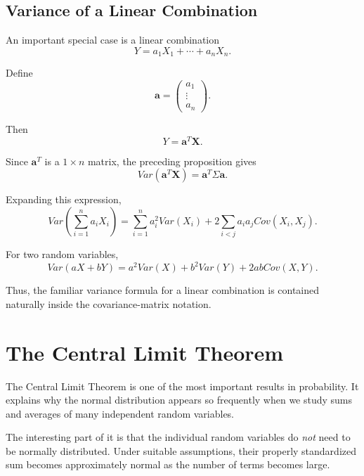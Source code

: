 \documentclass[11pt]{article}
\theoremstyle{definition}
\theoremstyle{plain}
\theoremstyle{remark}
\begin{document}
\subsection*{Variance of a Linear Combination}

An important special case is a linear combination
\[
Y=a_1X_1+\cdots+a_nX_n.
\]

Define
\[
\mathbf{a}
=
\begin{pmatrix}
a_1\\
\vdots\\
a_n
\end{pmatrix}.
\]

Then
\[
Y=\mathbf{a}^T\mathbf{X}.
\]

Since $\mathbf{a}^T$ is a $1\times n$ matrix, the preceding
proposition gives
\[
{
Var(\mathbf{a}^T\mathbf{X})
=
\mathbf{a}^T\Sigma\mathbf{a}.
}
\]

Expanding this expression,
\[
{
Var\left(\sum_{i=1}^n a_iX_i\right)
=
\sum_{i=1}^n a_i^2Var(X_i)
+
2\sum_{i<j}a_ia_jCov(X_i,X_j).
}
\]

For two random variables,
\[
{
Var(aX+bY)
=
a^2Var(X)
+
b^2Var(Y)
+
2abCov(X,Y).
}
\]

Thus, the familiar variance formula for a linear combination is
contained naturally inside the covariance-matrix notation.










\section{The Central Limit Theorem}

The Central Limit Theorem is one of the most important results in
probability. It explains why the normal distribution appears so
frequently when we study sums and averages of many independent random
variables.

The interesting part of it is that the individual random variables do
\emph{not} need to be normally distributed. Under suitable assumptions,
their properly standardized sum becomes approximately normal as the
number of terms becomes large.


\end{document}
